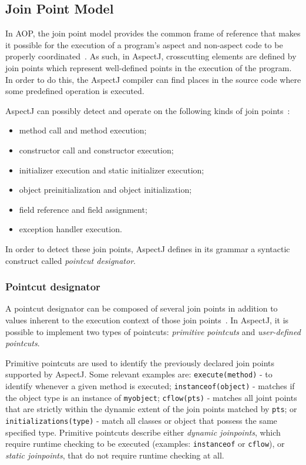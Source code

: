 \documentclass{template}
\begin{document}
\subsection{Join Point Model}

In AOP, the join point model provides the common frame of reference that makes it possible for the execution of a program's aspect and non-aspect code to be properly coordinated~\cite{Kiczales97aspect-orientedprogramming}. As such, in AspectJ, crosscutting elements are defined by join points which represent well-defined points in the execution of the program. In order to do this, the AspectJ compiler can find places in the source code where some predefined operation is executed. 

AspectJ can possibly detect and operate on the following kinds of join points~\cite{Kiselev2002}: 
\begin{itemize}
\item method call and method execution; 
\item constructor call and constructor execution; 
\item initializer execution and static initializer execution; 
\item object preinitialization and object initialization; 
\item field reference and field assignment; 
\item exception handler execution.
\end{itemize}

In order to detect these join points, AspectJ defines in its grammar a syntactic construct called \textit{pointcut designator}.

\subsubsection{Pointcut designator}

A pointcut designator can be composed of several join points in addition to values inherent to the execution context of those join points~\cite{Kiczales97aspect-orientedprogramming}. In AspectJ, it is possible to implement two types of pointcuts: \textit{primitive pointcuts} and \textit{user-defined pointcuts}.

Primitive pointcuts are used to identify the previously declared join points supported by AspectJ. Some relevant examples are: \texttt{execute(method)} - to identify whenever a given method is executed; \texttt{instanceof(object)} - matches if the object type is an instance of \texttt{myobject};
\texttt{cflow(pts)} - matches all joint points that are strictly within the dynamic extent of the join points matched by \texttt{pts}; or \texttt{initializations(type)} - match all classes or object that possess the same specified type.
Primitive pointcuts describe either \emph{dynamic joinpoints}, which require runtime checking to be executed (examples: \texttt{instanceof} or \texttt{cflow}), or \emph{static joinpoints}, that do not require runtime checking at all.
\end{document}
